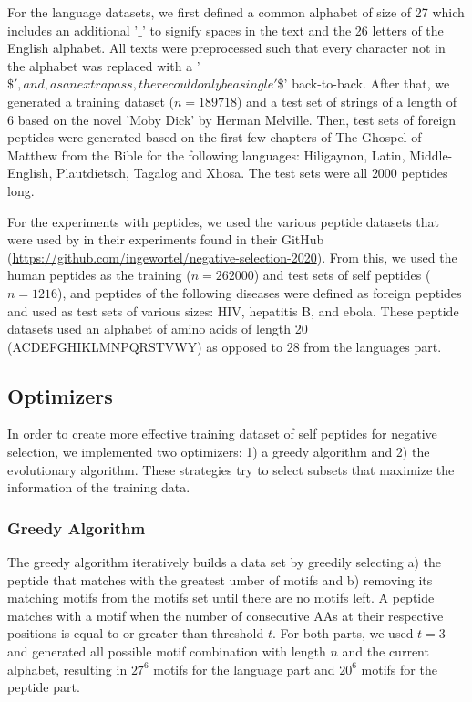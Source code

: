 \documentclass{article}
\begin{document}
For the language datasets, we first defined a common alphabet of size of 27 which includes an additional '$\_$' to 
signify spaces in the text and the 26 letters of the English alphabet.
All texts were preprocessed such that every character not in the alphabet was replaced with a 
'$\$', and, as an extra pass, there could only be a single '$\$' back-to-back. After that, we generated a training 
dataset ($n=189718$) and a test set of strings of a length of 6 based on the novel 'Moby Dick' by Herman Melville.
Then, test sets of foreign peptides were generated based on the first few chapters of The Ghospel of Matthew from the 
Bible for the following languages: Hiligaynon, Latin, Middle-English, Plautdietsch, Tagalog and Xhosa. 
The test sets were all $2000$ peptides long.

For the experiments with peptides, we used the various peptide datasets that were used by \textcite{wortel2020t} in 
their experiments found in their GitHub (\url{https://github.com/ingewortel/negative-selection-2020}). From this, we 
used the human peptides as the training ($n=262000$) and test sets of self peptides ($n=1216$), and peptides of the
following diseases were defined as foreign peptides and used as test sets of various sizes: HIV, hepatitis B, and ebola. 
These peptide datasets used an alphabet of amino acids of length 20 (ACDEFGHIKLMNPQRSTVWY) as opposed to 28 from the languages part.

\subsection{Optimizers} \label{optimizers}

In order to create more effective training dataset of self peptides for negative selection, we implemented two 
optimizers: 1) a greedy algorithm and 2) the evolutionary algorithm. These strategies try to select subsets that 
maximize the information of the training data.

\subsubsection{Greedy Algorithm}

The greedy algorithm iteratively builds a data set by greedily selecting a) the peptide that matches with the greatest 
umber of motifs and b) removing its matching motifs from the motifs set until there are no motifs left. A peptide 
matches with a motif when the number of consecutive AAs at their respective positions is equal to or greater than 
threshold $t$. For both parts, we used $t=3$ and generated all possible motif combination with length $n$ and the 
current alphabet, resulting in $27^6$ motifs for the language part and $20^6$ motifs for the peptide part.
\end{document}
